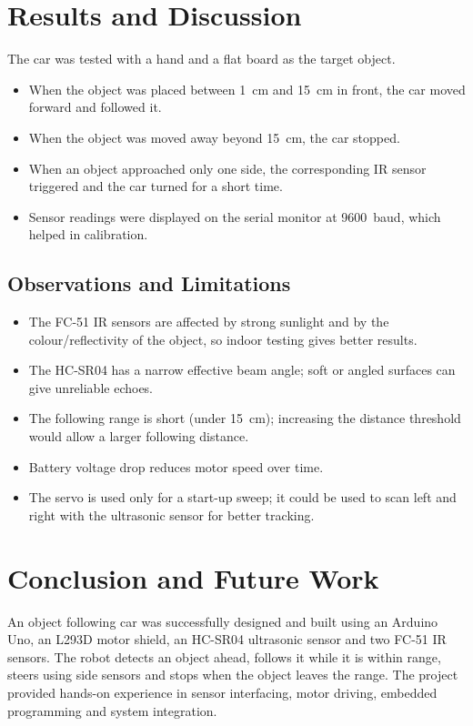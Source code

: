 \documentclass[12pt,a4paper]{article}
\begin{document}
\section{Results and Discussion}
The car was tested with a hand and a flat board as the target object.
\begin{itemize}
  \item When the object was placed between 1~cm and 15~cm in front, the car moved forward and followed it.
  \item When the object was moved away beyond 15~cm, the car stopped.
  \item When an object approached only one side, the corresponding IR sensor triggered and the car turned for a short time.
  \item Sensor readings were displayed on the serial monitor at 9600~baud, which helped in calibration.
\end{itemize}

\subsection{Observations and Limitations}
\begin{itemize}
  \item The FC-51 IR sensors are affected by strong sunlight and by the colour/reflectivity of the object, so indoor testing gives better results.
  \item The HC-SR04 has a narrow effective beam angle; soft or angled surfaces can give unreliable echoes.
  \item The following range is short (under 15~cm); increasing the distance threshold would allow a larger following distance.
  \item Battery voltage drop reduces motor speed over time.
  \item The servo is used only for a start-up sweep; it could be used to scan left and right with the ultrasonic sensor for better tracking.
\end{itemize}

\section{Conclusion and Future Work}
An object following car was successfully designed and built using an Arduino Uno, an L293D motor shield, an HC-SR04 ultrasonic sensor and two FC-51 IR sensors. The robot detects an object ahead, follows it while it is within range, steers using side sensors and stops when the object leaves the range. The project provided hands-on experience in sensor interfacing, motor driving, embedded programming and system integration.
\end{document}
